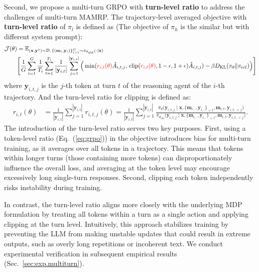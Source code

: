 Second, we propose a multi-turn GRPO with \textbf{turn-level ratio} to address the challenges of multi-turn MAMRP.
The trajectory-level averaged objective with \textbf{turn-level ratio} of $\pi_l$ is defined as (The objective of $\pi_h$ is the similar but with different system prompt):
{\small
\begin{equation}
\begin{aligned}
\mathcal{J}(\theta) &= \mathbb{E}_{(\mathbf{x},\mathbf{y}^*)\sim\mathcal{D},\, \{(\mathbf{m}_i, \mathbf{y}_i)\}_{i=1}^G \sim \pi_{\theta_{\mathrm{old}}}(\cdot|\mathbf{x})} 
\\
&\Bigg[
\frac{1}{G} \sum_{i=1}^G \frac{1}{T_i} \sum_{t=1}^{T_i} \frac{1}{|\mathbf{y}_{i,t}|} \sum_{j=1}^{|\mathbf{y}_{i,t}|}
\Big(
\min({\color{red}r_{i,t}(\theta)} \hat{A}_{i,t,j},\, \mathrm{clip}({\color{red}r_{i,t}(\theta)}, 1-\epsilon, 1+\epsilon) \hat{A}_{i,t,j})
- \beta D_{\mathrm{KL}}(\pi_\theta \| \pi_{\mathrm{ref}})
\Big)
\Bigg]
\end{aligned}
\end{equation}
}
where $\mathbf{y}_{i,t,j}$ is the $j$-th token at turn $t$ of the reasoning agent of the $i$-th trajectory. And the turn-level ratio for clipping is defined as:
\begin{align}
    r_{i,t}(\theta)
    &= \frac{1}{|\mathbf{y}_{i,t}|}\sum\limits_{j=1}^{|\mathbf{y}_{i,t}|} r_{i,t,j}(\theta)
    =\frac{1}{|\mathbf{y}_{i,t}|}\sum\limits_{j=1}^{|\mathbf{y}_{i,t}|}
    \frac{
    \pi_\theta
    \bigl(
        \mathbf{y}_{i,t,j}\mid \mathbf{x}, \{\mathbf{m}_{i,\cdot}, \mathbf{y}_{i, \cdot}\}_{<t},  \mathbf{m}_{i, t}, \mathbf{y}_{i,t,<j}
    \bigr)
    }{
    \pi_{\theta_{\mathrm{old}}}
        \bigl(
            \mathbf{y}_{i,t,j}\mid \mathbf{x}, \{\mathbf{m}_{i,\cdot}, \mathbf{y}_{i, \cdot}\}_{<t},  \mathbf{m}_{i, t}, \mathbf{y}_{i,t,<j}
        \bigr)
    }.
    \label{eq:turn_grpo}
\end{align}
The introduction of the turn-level ratio serves two key purposes. 
First, using a token-level ratio (Eq.~(\ref{eq:grpo})) in the objective introduces bias for multi-turn training, as it averages over all tokens in a trajectory. This means that tokens within longer turns (those containing more tokens) can disproportionately influence the overall loss, and averaging at the token level may encourage excessively long single-turn responses. Second, clipping each token independently risks instability during training.

In contrast, the turn-level ratio aligns more closely with the underlying MDP formulation by treating all tokens within a turn as a single action and applying clipping at the turn level.
Intuitively, this approach stabilizes training by preventing the LLM from making unstable updates that could result in extreme outputs, such as overly long repetitions or incoherent text.
We conduct experimental verification in subsequent empirical results (Sec.~\ref{sec:exp.multiturn}).

